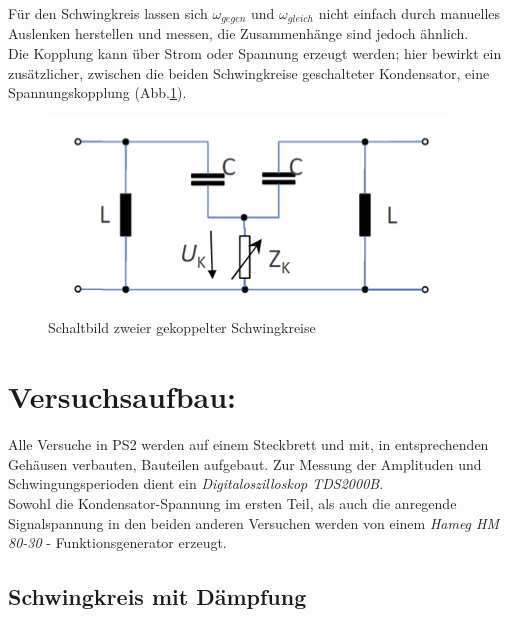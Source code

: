 \documentclass[12pt,a4paper]{article}
\begin{document}
\begin{multicols}{2}
\noindent Für den Schwingkreis lassen sich $\omega_{gegen}$ und $\omega_{gleich}$ nicht einfach durch manuelles Auslenken herstellen und messen, die Zusammenhänge sind jedoch ähnlich.\\
Die Kopplung kann über Strom oder Spannung erzeugt werden; hier bewirkt ein zusätzlicher, zwischen die beiden Schwingkreise geschalteter Kondensator, eine Spannungskopplung (Abb.\ref{fig:kopplung_skizze}).

\begin{figure}[H]
	\centering
	\includegraphics[scale=1.1]{./figure/kopplung_skizze.png}
	\caption{Schaltbild zweier gekoppelter Schwingkreise}
	\label{fig:kopplung_skizze}
\end{figure}






\pagebreak
\section{Versuchsaufbau:}

Alle Versuche in PS2 werden auf einem Steckbrett und mit, in entsprechenden Gehäusen verbauten, Bauteilen aufgebaut. Zur Messung der Amplituden und Schwingungsperioden dient ein \emph{Digitaloszilloskop TDS2000B}.\\
Sowohl die Kondensator-Spannung im ersten Teil, als auch die anregende Signalspannung in den beiden anderen Versuchen werden von einem \emph{Hameg HM 80-30} - Funktionsgenerator erzeugt. 

\subsection{Schwingkreis mit Dämpfung}


\end{multicols}
\end{document}

